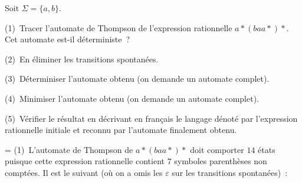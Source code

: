 \documentclass[12pt,a4paper]{article}
\theoremstyle{definition}
\newif\ifcorrige
\newenvironment{corrige}%
{\ifcorrige\relax\else\setbox0=\vbox\bgroup\fi%
\smallbreak\footnotesize\noindent{\underbar{\textit{Corrigé.}}\quad}}
{{\hbox{}\nobreak\hfill\checkmark}%
\ifcorrige\relax\else\egroup\fi\par}
\begin{document}
Soit $\Sigma = \{a,b\}$.

(1) Tracer l'automate de Thompson de l'expression rationnelle
$a{*}(baa{*}){*}$.  Cet automate est-il déterministe ?

(2) En éliminer les transitions spontanées.

(3) Déterminiser l'automate obtenu (on demande un automate complet).

(4) Minimiser l'automate obtenu (on demande un automate complet).

(5) Vérifier le résultat en décrivant en français le langage dénoté
par l'expression rationnelle initiale et reconnu par l'automate
finalement obtenu.

\begin{corrige}
(1) L'automate de Thompson de $a{*}(baa{*}){*}$ doit comporter $14$
  états puisque cette expression rationnelle contient $7$ symboles
  parenthèses non comptées.  Il est le suivant (où on a omis les
  $\varepsilon$ sur les transitions spontanées) :
\begin{center}
\scalebox{0.34}{%

}
\end{center}
\end{corrige}
\end{document}
